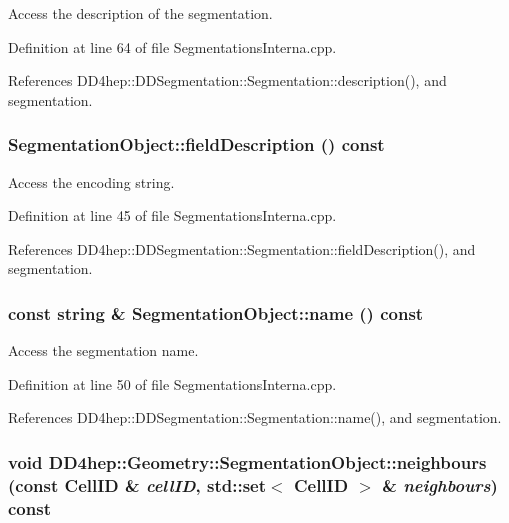 Access the description of the segmentation. 

Definition at line 64 of file SegmentationsInterna.cpp.

References DD4hep::DDSegmentation::Segmentation::description(), and segmentation.\hypertarget{class_d_d4hep_1_1_geometry_1_1_segmentation_object_a6bc072f2300d6869228cd55a48bc1945}{
\subsubsection[{fieldDescription}]{ SegmentationObject::fieldDescription () const}}
\label{class_d_d4hep_1_1_geometry_1_1_segmentation_object_a6bc072f2300d6869228cd55a48bc1945}


Access the encoding string. 

Definition at line 45 of file SegmentationsInterna.cpp.

References DD4hep::DDSegmentation::Segmentation::fieldDescription(), and segmentation.\hypertarget{class_d_d4hep_1_1_geometry_1_1_segmentation_object_aad3049b7772dc945e0ce68deed8a0d23}{
\subsubsection[{name}]{\setlength{\rightskip}{0pt plus 5cm}const {\bf string} \& SegmentationObject::name () const}}
\label{class_d_d4hep_1_1_geometry_1_1_segmentation_object_aad3049b7772dc945e0ce68deed8a0d23}


Access the segmentation name. 

Definition at line 50 of file SegmentationsInterna.cpp.

References DD4hep::DDSegmentation::Segmentation::name(), and segmentation.\hypertarget{class_d_d4hep_1_1_geometry_1_1_segmentation_object_a923aab6baaf9590932b3fe05b305edb2}{
\subsubsection[{neighbours}]{\setlength{\rightskip}{0pt plus 5cm}void DD4hep::Geometry::SegmentationObject::neighbours (const CellID \& {\em cellID}, \/  std::set$<$ CellID $>$ \& {\em neighbours}) const}}
\label{class_d_d4hep_1_1_geometry_1_1_segmentation_object_a923aab6baaf9590932b3fe05b305edb2}


